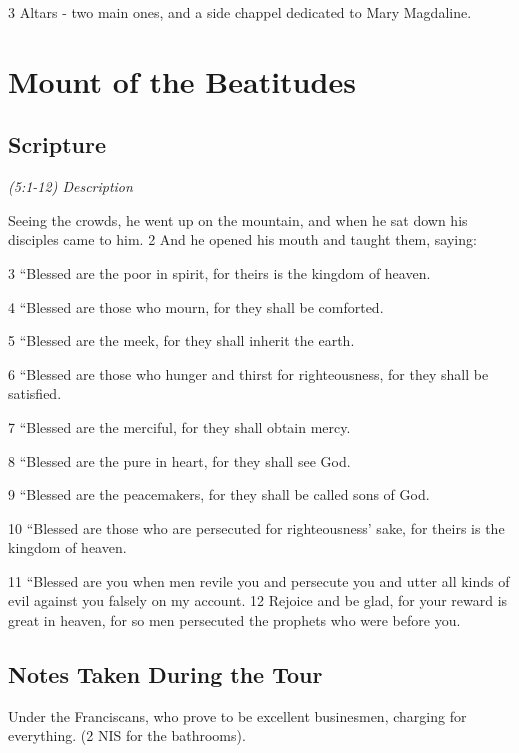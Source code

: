 \documentclass[letterpaper]{report}
\begin{document}
3 Altars - two main ones, and a side chappel dedicated to Mary Magdaline.

\clearpage
\section{Mount of the Beatitudes}
\begin{multicols}{2}
	\mbox{}
\end{multicols}
\subsection{Scripture}

{\centering
	\emph{(5:1-12) Description}\\
}
\begin{multicols}{2}
Seeing the crowds, he went up on the mountain, and when he sat down his disciples came to him. 2 And he opened his mouth and taught them, saying:

3 “Blessed are the poor in spirit, for theirs is the kingdom of heaven.

4 “Blessed are those who mourn, for they shall be comforted.

5 “Blessed are the meek, for they shall inherit the earth.

6 “Blessed are those who hunger and thirst for righteousness, for they shall be satisfied.

7 “Blessed are the merciful, for they shall obtain mercy.

8 “Blessed are the pure in heart, for they shall see God.

9 “Blessed are the peacemakers, for they shall be called sons of God.

10 “Blessed are those who are persecuted for righteousness’ sake, for theirs is the kingdom of heaven.

11 “Blessed are you when men revile you and persecute you and utter all kinds of evil against you falsely on my account. 12 Rejoice and be glad, for your reward is great in heaven, for so men persecuted the prophets who were before you.
\end{multicols}

\subsection{Notes Taken During the Tour}
Under the Franciscans, who prove to be excellent businesmen, charging for everything. (2 NIS for the bathrooms).
\end{document}
